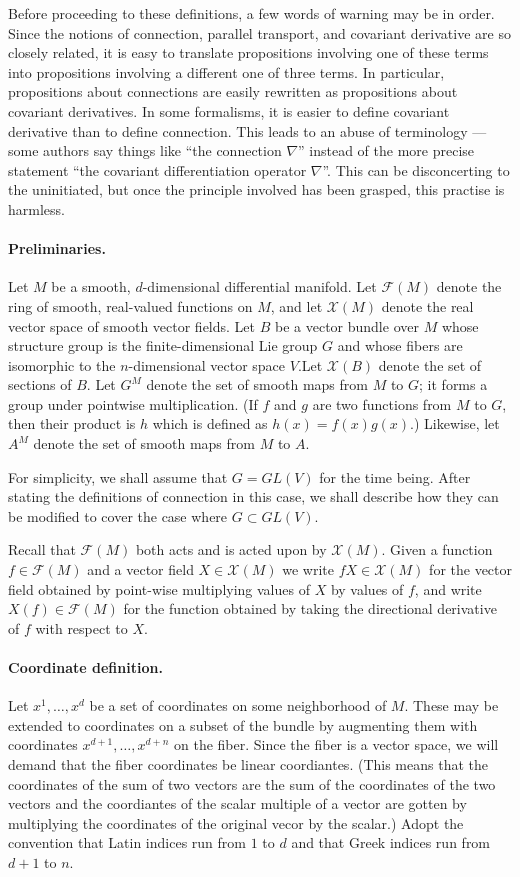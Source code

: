\documentclass[12pt]{article}
\newcommand{\vs}{\mathcal{X}}
\newcommand{\fs}{\mathcal{F}}
\begin{document}
Before proceeding to these definitions, a few words of warning may be in order.  Since the notions of connection, parallel transport, and covariant derivative are so closely related, it is easy to translate propositions involving one of these terms into propositions involving a different one of three terms.  In particular, propositions about connections are easily rewritten as propositions about covariant derivatives.  In some formalisms, it is easier to define covariant derivative than to define connection.  This leads to an abuse of terminology --- some authors say things like ``the connection $\nabla$'' instead of the more precise statement ``the covariant differentiation operator $\nabla$''.  This can be disconcerting to the uninitiated, but once the principle involved has been grasped, this practise is harmless. 

\paragraph{Preliminaries.}
Let $M$ be a smooth, $d$-dimensional differential manifold. Let $\fs(M)$ denote
the ring of smooth, real-valued functions on $M$, and let $\vs(M)$ denote
the real vector space of smooth vector fields.  Let $B$ be a vector bundle over $M$ whose structure group is the finite-dimensional Lie group $G$ and whose fibers are isomorphic to the $n$-dimensional vector space $V$.Let $\vs (B)$ denote the set of sections of $B$.  Let $G^M$ denote the set of smooth maps from $M$ to $G$; it forms a group under pointwise multiplication.  (If $f$ and $g$ are two functions from $M$ to $G$, then their product is $h$ which is defined as $h(x) = f(x) g(x)$.)  Likewise, let $A^M$ denote the set of smooth maps from $M$ to $A$.

For simplicity, we shall assume that $G = GL(V)$ for the time being.  After stating the definitions of connection in this case, we shall describe how they can be modified to cover the case where $G \subset GL(V)$.

Recall that $\fs(M)$ both acts and is acted upon by $\vs(M)$.  Given a
function $f\in\fs(M)$ and a vector field $X\in\vs(M)$ we write
$fX\in\vs(M)$ for the vector field obtained by point-wise multiplying
values of $X$ by values of $f$, and write $X(f)\in \fs(M)$ for the
function obtained by taking the directional derivative of $f$ with
respect to $X$.

\paragraph{Coordinate definition.} 
Let $x^1, \ldots ,x^d$ be a set of coordinates on some neighborhood of $M$.  These may be extended to coordinates on a subset of the bundle by augmenting them with coordinates $x^{d+1}, \ldots ,x^{d+n}$ on the fiber.  Since the fiber is a vector space, we will demand that the fiber coordinates be linear coordiantes.  (This means that the coordinates of the sum of two vectors are the sum of the coordinates of the two vectors and the coordiantes of the scalar multiple of a vector are gotten by multiplying the coordinates of the original vecor by the scalar.)  Adopt the convention that Latin indices run from $1$ to $d$ and that Greek indices run from $d+1$ to $n$.
\end{document}
